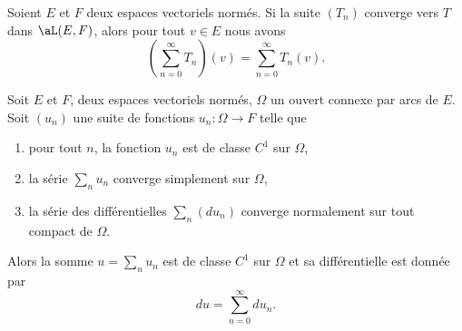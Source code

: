 \begin{lemma}
    Soient \( E\) et \( F\) deux espaces vectoriels normés. Si la suite \( (T_n)\) converge vers \( T\) dans \( \aL(E,F)\), alors pour tout \( v\in E\) nous avons
    \begin{equation}
        \left( \sum_{n=0}^{\infty}T_n \right)(v)=\sum_{n=0}^{\infty}T_n(v).
    \end{equation}
\end{lemma}

\begin{theorem} \label{ThoLDpRmXQ}
    Soit \( E\) et \( F\), deux espaces vectoriels normés, \( \Omega\) un ouvert connexe par arcs de \( E\). Soit \( (u_n)\) une suite de fonctions \( u_n\colon \Omega\to F\) telle que
    \begin{enumerate}
        \item
            pour tout \( n\), la fonction \( u_n\) est de classe \( C^1\) sur \( \Omega\),
        \item
            la série \( \sum_nu_n\) converge simplement sur \( \Omega\),
        \item
            la série des différentielles \( \sum_n(du_n)\) converge normalement sur tout compact de \( \Omega\).
    \end{enumerate}
    Alors la somme \( u=\sum_nu_n\) est de classe \( C^1\) sur \( \Omega\) et sa différentielle est donnée par
    \begin{equation}
        du=\sum_{n=0}^{\infty}du_n.
    \end{equation}
\end{theorem}

